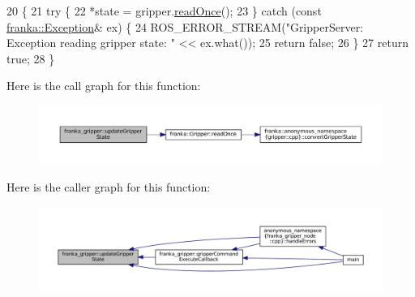 \begin{DoxyCode}
20                                                                                  \{
21   \textcolor{keywordflow}{try} \{
22     *state = gripper.\hyperlink{classfranka_1_1Gripper_ab0afc8a41c9c5fff808e76851dcf23ce}{readOnce}();
23   \} \textcolor{keywordflow}{catch} (\textcolor{keyword}{const} \hyperlink{structfranka_1_1Exception}{franka::Exception}& ex) \{
24     ROS\_ERROR\_STREAM(\textcolor{stringliteral}{"GripperServer: Exception reading gripper state: "} << ex.what());
25     \textcolor{keywordflow}{return} \textcolor{keyword}{false};
26   \}
27   \textcolor{keywordflow}{return} \textcolor{keyword}{true};
28 \}
\end{DoxyCode}
Here is the call graph for this function\+:
\nopagebreak
\begin{figure}[H]
\begin{center}
\leavevmode
\includegraphics[width=350pt]{namespacefranka__gripper_a8d26c346602cc39ab2495f2fffc99d9c_cgraph}
\end{center}
\end{figure}
Here is the caller graph for this function\+:
\nopagebreak
\begin{figure}[H]
\begin{center}
\leavevmode
\includegraphics[width=350pt]{namespacefranka__gripper_a8d26c346602cc39ab2495f2fffc99d9c_icgraph}
\end{center}
\end{figure}
